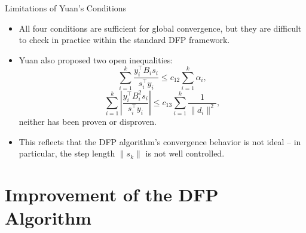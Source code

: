 \documentclass[aspectratio=169]{beamer}
\begin{document}
	\begin{frame}{Limitations of Yuan's Conditions}
		\begin{itemize}
			\item All four conditions are sufficient for global convergence, but they are difficult to check in practice within the standard DFP framework.
			\item Yuan also proposed two open inequalities:
			\[
			\sum_{i=1}^k \frac{y_i^\top B_i s_i}{s_i^\top y_i} \le c_{12} \sum_{i=1}^k \alpha_i,
			\]
			\[
			\sum_{i=1}^k \left|\frac{y_i^\top B_i^2 s_i}{s_i^\top y_i}\right| \le c_{13} \sum_{i=1}^k \frac{1}{\|d_i\|^2},
			\]
			neither has been proven or disproven.
			\item This reflects that the DFP algorithm's convergence behavior is not ideal – in particular, the step length $\|s_k\|$ is not well controlled.
		\end{itemize}
	\end{frame}
	
	\section{Improvement of the DFP Algorithm}
	
\end{document}
